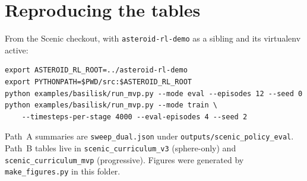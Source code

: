 \documentclass[10pt]{article}
\begin{document}
\section{Reproducing the tables}
\label{app:repro}

From the Scenic checkout, with \texttt{asteroid-rl-demo} as a sibling and its virtualenv active:
\begin{lstlisting}
export ASTEROID_RL_ROOT=../asteroid-rl-demo
export PYTHONPATH=$PWD/src:$ASTEROID_RL_ROOT
python examples/basilisk/run_mvp.py --mode eval --episodes 12 --seed 0
python examples/basilisk/run_mvp.py --mode train \
    --timesteps-per-stage 4000 --eval-episodes 4 --seed 2
\end{lstlisting}
Path~A summaries are \texttt{sweep\_dual.json} under \texttt{outputs/scenic\_policy\_eval}.
Path~B tables live in \texttt{scenic\_curriculum\_v3} (sphere-only) and \texttt{scenic\_curriculum\_mvp} (progressive).
Figures were generated by \texttt{make\_figures.py} in this folder.
\end{document}
